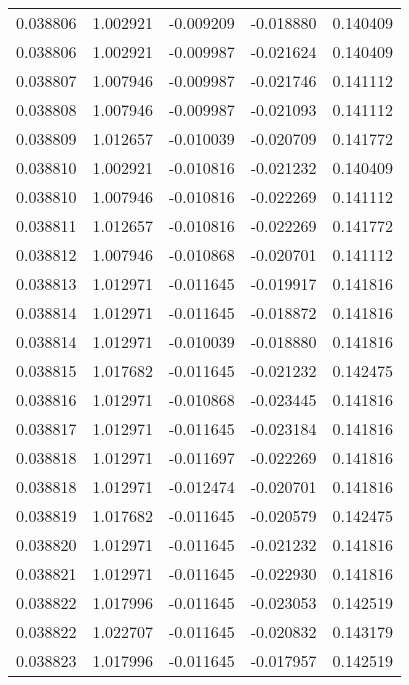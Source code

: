 \begin{tabular}{lrrrr}
0.038806    &  1.002921 & -0.009209 & -0.018880 &             0.140409 \\
0.038806    &  1.002921 & -0.009987 & -0.021624 &             0.140409 \\
0.038807    &  1.007946 & -0.009987 & -0.021746 &             0.141112 \\
0.038808    &  1.007946 & -0.009987 & -0.021093 &             0.141112 \\
0.038809    &  1.012657 & -0.010039 & -0.020709 &             0.141772 \\
0.038810    &  1.002921 & -0.010816 & -0.021232 &             0.140409 \\
0.038810    &  1.007946 & -0.010816 & -0.022269 &             0.141112 \\
0.038811    &  1.012657 & -0.010816 & -0.022269 &             0.141772 \\
0.038812    &  1.007946 & -0.010868 & -0.020701 &             0.141112 \\
0.038813    &  1.012971 & -0.011645 & -0.019917 &             0.141816 \\
0.038814    &  1.012971 & -0.011645 & -0.018872 &             0.141816 \\
0.038814    &  1.012971 & -0.010039 & -0.018880 &             0.141816 \\
0.038815    &  1.017682 & -0.011645 & -0.021232 &             0.142475 \\
0.038816    &  1.012971 & -0.010868 & -0.023445 &             0.141816 \\
0.038817    &  1.012971 & -0.011645 & -0.023184 &             0.141816 \\
0.038818    &  1.012971 & -0.011697 & -0.022269 &             0.141816 \\
0.038818    &  1.012971 & -0.012474 & -0.020701 &             0.141816 \\
0.038819    &  1.017682 & -0.011645 & -0.020579 &             0.142475 \\
0.038820    &  1.012971 & -0.011645 & -0.021232 &             0.141816 \\
0.038821    &  1.012971 & -0.011645 & -0.022930 &             0.141816 \\
0.038822    &  1.017996 & -0.011645 & -0.023053 &             0.142519 \\
0.038822    &  1.022707 & -0.011645 & -0.020832 &             0.143179 \\
0.038823    &  1.017996 & -0.011645 & -0.017957 &             0.142519 \\

\end{tabular}

